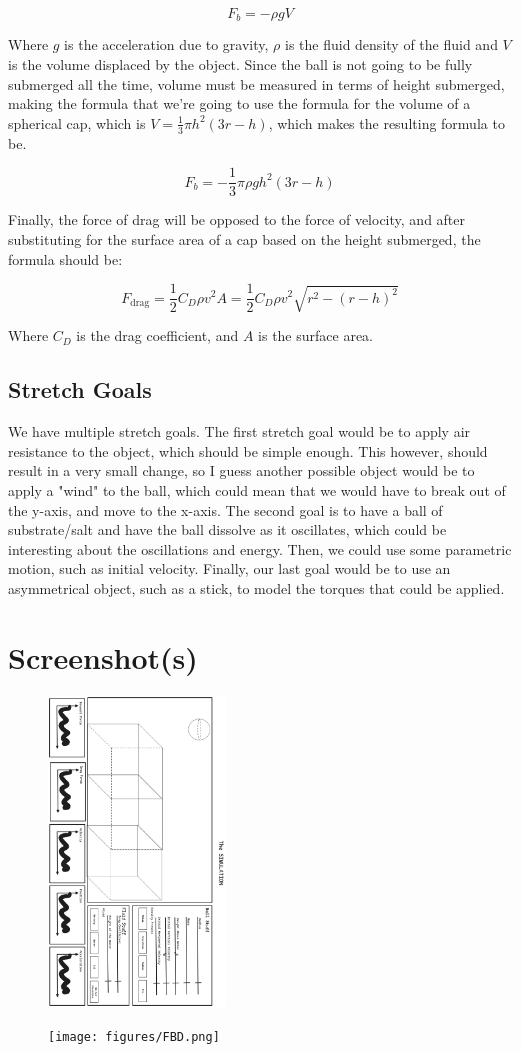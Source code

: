 \documentclass{article}
\begin{document}
$$F_b = -\rho gV$$

Where $g$ is the acceleration due to gravity, $\rho$ is the fluid density of the fluid and $V$ is the volume displaced by the object. Since the ball is not going to be fully submerged all the time, volume must be measured in terms of height submerged, making the formula that we're going to use the formula for the volume of a spherical cap, which is $V = \frac{1}{3}\pi h^2 (3r - h)$, which makes the resulting formula to be.

$$F_b = - \frac{1}{3} \pi \rho g h^2 (3r - h)$$

Finally, the force of drag will be opposed to the force of velocity, and after substituting for the surface area of a cap based on the height submerged, the formula should be:

$$F_{\text{drag}} = \frac{1}{2} C_D \rho v^2 A = \frac{1}{2} C_D \rho v^2 \sqrt{r^2 - (r-h)^2}$$

Where $C_D$ is the drag coefficient, and $A$ is the surface area.

\subsection{Stretch Goals}

We have multiple stretch goals. The first stretch goal would be to apply air resistance to the object, which should be simple enough. This however, should result in a very small change, so I guess another possible object would be to apply a "wind" to the ball, which could mean that we would have to break out of the y-axis, and move to the x-axis. The second goal is to have a ball of substrate/salt and have the ball dissolve as it oscillates, which could be interesting about the oscillations and energy. Then, we could use some parametric motion, such as initial velocity. Finally, our last goal would be to use an asymmetrical object, such as a stick, to model the torques that could be applied.

\section{Screenshot(s)}


\begin{figure}[H]
    \centering
    \includegraphics[width=0.42\textwidth]{figures/SIM.png}
\end{figure}

\begin{figure}[H]
    \centering
    \texttt{[image: figures/FBD.png]}
\end{figure}
\end{document}
